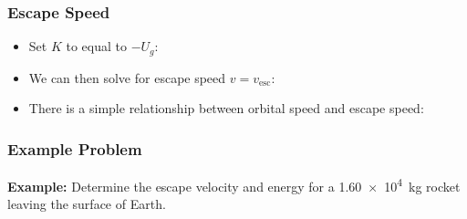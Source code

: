 \documentclass[12pt,compress,aspectratio=169]{beamer}
\begin{document}
\begin{frame}
  \frametitle{Escape Speed}
  \begin{itemize}
  \item Set $K$ to equal to $-U_g$:
    
  \item We can then solve for escape speed $v=v_\mathrm{esc}$:


  \item There is a simple relationship between orbital speed and escape
    speed:

  \end{itemize}
\end{frame}

\begin{frame}
  \frametitle{Example Problem}
  \textbf{Example:} Determine the escape velocity and energy for a
  \SI{1.60e4}{\kg} rocket leaving the surface of Earth.
\end{frame}
\end{document}
